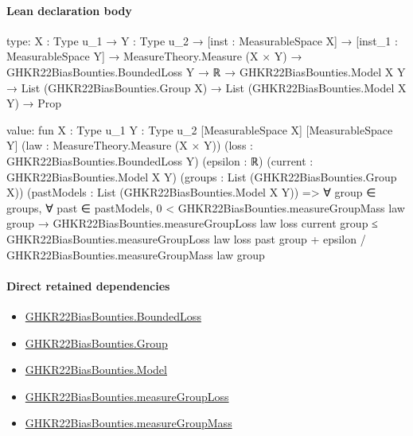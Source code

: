 \documentclass[10pt]{article}
\begin{document}
\paragraph{Lean declaration body}
\begin{ReviewVerbatim}
type:
{X : Type u_1} →
  {Y : Type u_2} →
    [inst : MeasurableSpace X] →
      [inst_1 : MeasurableSpace Y] →
        MeasureTheory.Measure (X × Y) →
          GHKR22BiasBounties.BoundedLoss Y →
            ℝ →
              GHKR22BiasBounties.Model X Y →
                List (GHKR22BiasBounties.Group X) → List (GHKR22BiasBounties.Model X Y) → Prop

value:
fun {X : Type u_1} {Y : Type u_2} [MeasurableSpace X] [MeasurableSpace Y] (law : MeasureTheory.Measure (X × Y))
    (loss : GHKR22BiasBounties.BoundedLoss Y) (epsilon : ℝ) (current : GHKR22BiasBounties.Model X Y)
    (groups : List (GHKR22BiasBounties.Group X)) (pastModels : List (GHKR22BiasBounties.Model X Y)) =>
  ∀ group ∈ groups,
    ∀ past ∈ pastModels,
      0 < GHKR22BiasBounties.measureGroupMass law group →
        GHKR22BiasBounties.measureGroupLoss law loss current group ≤
          GHKR22BiasBounties.measureGroupLoss law loss past group +
            epsilon / GHKR22BiasBounties.measureGroupMass law group
\end{ReviewVerbatim}

\paragraph{Direct retained dependencies}
\begin{itemize}\raggedright
\item \hyperlink{paper-prerequisite-ef6c319b0770dad4}{GHKR22\allowbreak{}Bias\allowbreak{}Bounties.\allowbreak{}Bounded\allowbreak{}Loss}
\item \hyperlink{paper-prerequisite-cc7214115b27106f}{GHKR22\allowbreak{}Bias\allowbreak{}Bounties.\allowbreak{}Group}
\item \hyperlink{paper-prerequisite-333127605c12eba8}{GHKR22\allowbreak{}Bias\allowbreak{}Bounties.\allowbreak{}Model}
\item \hyperlink{paper-prerequisite-c9cff6ba9100bf1c}{GHKR22\allowbreak{}Bias\allowbreak{}Bounties.\allowbreak{}measure\allowbreak{}Group\allowbreak{}Loss}
\item \hyperlink{paper-prerequisite-ac1a5a161f2dd3f6}{GHKR22\allowbreak{}Bias\allowbreak{}Bounties.\allowbreak{}measure\allowbreak{}Group\allowbreak{}Mass}
\end{itemize}
\hypertarget{governing-declaration-1ea5569f12977b0e}{}
\end{document}
